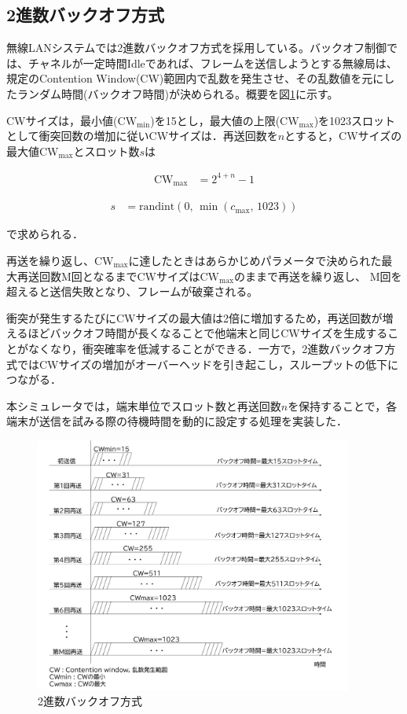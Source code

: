 \documentclass[a4paper,10pt]{ltjsarticle}
\begin{document}
\clearpage
\subsection{2進数バックオフ方式}

無線LANシステムでは2進数バックオフ方式を採用している。バックオフ制御では、チャネルが一定時間Idleであれば、フレームを送信しようとする無線局は、規定のContention Window(CW)範囲内で乱数を発生させ、その乱数値を元にしたランダム時間(バックオフ時間)が決められる。概要を図\ref{binary-backoff}に示す。


CWサイズは，最小値($\mathrm{CW_{min}}$)を15とし，最大値の上限($\mathrm{CW_{max}}$)を1023スロットとして衝突回数の増加に従いCWサイズは．再送回数を$n$とすると，CWサイズの最大値$\mathrm{CW}_{\max}$とスロット数$s$は


\begin{align}
  \mathrm{CW}_{\max} &= 2^{4 + n} - 1
\end{align}

\begin{align}
  s &= \mathrm{randint}(0, \, \min(c_{\max}, \, 1023))
  \label{slot}
\end{align}

で求められる．

再送を繰り返し、$\mathrm{CW_{max}}$に達したときはあらかじめパラメータで決められた最大再送回数M回となるまでCWサイズは$\mathrm{CW_{max}}$のままで再送を繰り返し、
M回を超えると送信失敗となり、フレームが破棄される。

衝突が発生するたびにCWサイズの最大値は2倍に増加するため，再送回数が増えるほどバックオフ時間が長くなることで他端末と同じCWサイズを生成することがなくなり，衝突確率を低減することができる．一方で，2進数バックオフ方式ではCWサイズの増加がオーバーヘッドを引き起こし，スループットの低下につながる．


本シミュレータでは，端末単位でスロット数と再送回数$n$を保持することで，各端末が送信を試みる際の待機時間を動的に設定する処理を実装した．

\begin{figure}[H]
  \centering
  \includegraphics[width=0.93\textwidth]{./assets/CW_.png}
  \caption{2進数バックオフ方式}
  \label{binary-backoff}
\end{figure}
\end{document}
